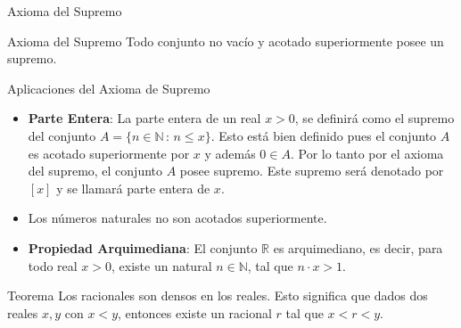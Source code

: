 \documentclass[5pt]{beamer} %
\begin{document}
\begin{frame}{Axioma del Supremo}
	\begin{block}{Axioma del Supremo}
			Todo conjunto no vacío y acotado superiormente posee un supremo.
		\end{block}
	
\begin{exampleblock}{Aplicaciones del Axioma de Supremo}
\begin{itemize}
	\item {\bf Parte Entera}: La parte entera de un real $x > 0$, se definirá como el supremo del	conjunto $A = \{n \in \mathbb{N}\, :\, n \leq x\}$. Esto está bien definido pues el conjunto $A$ es acotado superiormente por $x$ y además $0\in A$. Por lo tanto por el axioma del supremo, el conjunto $A$ posee supremo. Este
	supremo será denotado por $[x]$ y se llamará parte entera de $x$.
	
	\item Los números naturales no son acotados superiormente.
	
	\item {\bf Propiedad Arquimediana}: El conjunto $\mathbb{R}$ es arquimediano, es decir, para todo real $x > 0$, existe un natural $n \in \mathbb{N}$, tal que $n \cdot x > 1$.
	
\end{itemize}	
	
\end{exampleblock}	
	
\end{frame}

\begin{frame}
	\begin{block}{Teorema}
Los racionales son densos en los reales. Esto significa que dados dos reales $x, y$
con $x < y$, entonces existe un racional $r$ tal que $x < r < y$.
	\end{block}


\end{frame}
\end{document}
